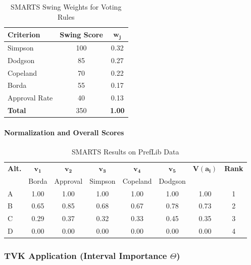 \documentclass[conference]{IEEEtran}
\begin{document}
\begin{table}[H]
	\caption{SMARTS Swing Weights for Voting Rules}
		\centering
	\scriptsize  
	\setlength{\tabcolsep}{2pt}  
	\renewcommand{\arraystretch}{1.5} 
	\label{tab:preflib_smarts_weights}
	\begin{tabular}{|l|c|c|}
		\hline
		\textbf{Criterion} & \textbf{Swing Score} & $\mathbf{w_j}$ \\
		\hline
		Simpson & 100 & 0.32 \\
		Dodgson & 85 & 0.27 \\
		Copeland & 70 & 0.22 \\
		Borda & 55 & 0.17 \\
		Approval Rate & 40 & 0.13 \\
		\hline
		\textbf{Total} & 350 & \textbf{1.00} \\
		\hline
	\end{tabular}
\end{table}

\paragraph{Normalization and Overall Scores}

\begin{table}[H]
	\scriptsize 
	\setlength{\tabcolsep}{1.8pt} 
	\renewcommand{\arraystretch}{1.7} 
	\centering
	\caption{SMARTS Results on PrefLib Data}
	\label{tab:preflib_smarts_results}
	\begin{tabular}{|l|ccccc|c|c|}
		\hline
		\textbf{Alt.} & $\mathbf{v_1}$ & $\mathbf{v_2}$ & $\mathbf{v_3}$ & $\mathbf{v_4}$ & $\mathbf{v_5}$ & $\mathbf{V(a_i)}$ & \textbf{Rank} \\
		& Borda & Approval & Simpson & Copeland & Dodgson & & \\
		\hline
		A & 1.00 & 1.00 & 1.00 & 1.00 & 1.00 & 1.00 & 1 \\
		B & 0.65 & 0.85 & 0.68 & 0.67 & 0.78 & 0.73 & 2 \\
		C & 0.29 & 0.37 & 0.32 & 0.33 & 0.45 & 0.35 & 3 \\
		D & 0.00 & 0.00 & 0.00 & 0.00 & 0.00 & 0.00 & 4 \\
		\hline
	\end{tabular}
\end{table}

\subsubsection{TVK Application (Interval Importance $\Theta$)}
\end{document}
